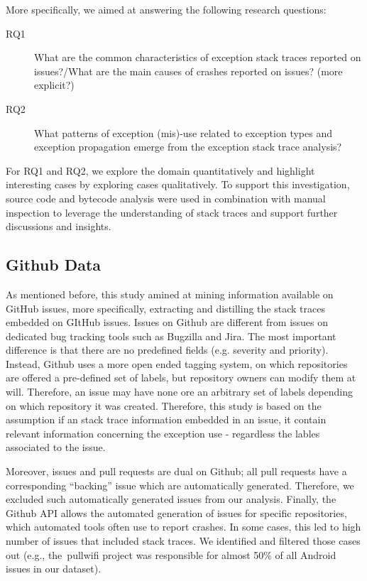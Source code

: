 \documentclass[conference]{IEEEtran}
\begin{document}
 More specifically, we aimed at answering
the following research questions:

\begin{description}

  \item[RQ1] What are the common characteristics of exception stack traces reported on issues?/What are the main causes of crashes reported on issues? (more explicit?)

  \item[RQ2] What patterns of exception (mis)-use related to exception types and exception propagation emerge from the exception stack trace analysis?

\end{description}

For RQ1 and RQ2, we explore the domain quantitatively and highlight interesting cases by 
exploring cases qualitatively. To support this investigation, source code and bytecode 
analysis were used in combination with manual inspection to leverage the  understanding of stack traces and support further discussions and insights. 

\subsection{Github Data}
\label{sec:git}

As mentioned before, this study amined at mining information available on GitHub issues,
more specifically, extracting and distilling the stack traces embedded on GItHub issues. 
Issues on Github are different from issues on dedicated bug tracking tools such as 
Bugzilla and Jira. The most important difference is that there are no predefined fields
  (e.g. severity and priority). Instead, Github uses a more open ended tagging system, on which
repositories are offered a pre-defined set of labels, but repository owners can modify 
them at will. Therefore, an issue may have none ore an arbitrary set of labels depending 
on which repository it was created. Therefore, this study is based on the assumption 
if an stack trace information embedded in an issue, it contain relevant information
 concerning the exception use -  regardless the lables associated to the issue.

Moreover, issues and pull requests are dual on Github; all pull requests have a corresponding 
``backing'' issue which
are automatically generated. Therefore, we excluded such automatically generated
issues from our analysis. Finally, the Github API allows the automated
generation of issues for specific repositories, which automated tools often use
to report crashes. In some cases, this led to high number of issues that
included stack traces. We identified and filtered those cases out (e.g.,
the~\textsf{pullwifi} project was responsible for almost 50\% of all Android issues in our dataset).
\end{document}
